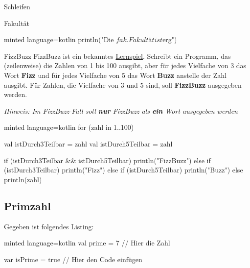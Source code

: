 \begin{task}[points=auto]{Schleifen}
\begin{subtask*}[points=0]{Fakultät }
\begin{solution}
\begin{codeBlock}[]{minted language=kotlin}
            println("Die $fak. Fakultät ist $erg")
            \end{codeBlock}
        \end{solution}
    \end{subtask*}
    \begin{subtask*}[points=0]{FizzBuzz }
        FizzBuzz ist ein bekanntes \href{https://en.wikipedia.org/wiki/Fizz_buzz}{Lernspiel}. Schreibt ein Programm, das (zeilenweise) die Zahlen von 1 bis 100 ausgibt, aber für jedes Vielfache von 3 das Wort \textbf{Fizz} und für jedes Vielfache von 5 das Wort \textbf{Buzz} anstelle der Zahl ausgibt. Für Zahlen, die Vielfache von 3 und 5 sind, soll \textbf{FizzBuzz} ausgegeben werden.

        \textit{Hinweis: Im FizzBuzz-Fall soll \textbf{nur} FizzBuzz als \textbf{ein} Wort ausgegeben werden}

        \begin{solution}
            \begin{codeBlock}[]{minted language=kotlin}
                for (zahl in 1..100) {
                    val istDurch3Teilbar = zahl %
                    val istDurch5Teilbar = zahl %

                    if (istDurch3Teilbar && istDurch5Teilbar) {
                        println("FizzBuzz")
                    } else if (istDurch3Teilbar) {
                        println("Fizz")
                    } else if (istDurch5Teilbar) {
                        println("Buzz")
                    } else {
                        println(zahl)
                    }
                }
            \end{codeBlock}
        \end{solution}
    \end{subtask*}
    \begin{subtask*}[points=0]{}
        \subsection{Primzahl }
        Gegeben ist folgendes Listing:
        \begin{codeBlock}[]{minted language=kotlin}
                val prime = 7 // Hier die Zahl

                var isPrime = true
                // Hier den Code einfügen


\end{codeBlock}
\end{subtask*}
\end{task}
